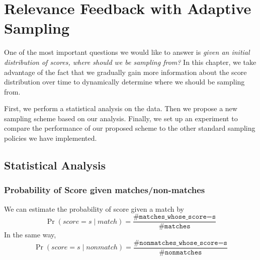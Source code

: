 \graphicspath{{./images/chap6/}}
\chapter{Relevance Feedback with Adaptive Sampling}

One of the most important questions we would like to answer is \emph{given an
initial distribution of scores, where should we be sampling from?} In this
chapter, we take advantage of the fact that we gradually gain more
information about the score distribution over time to dynamically determine
where we should be sampling from.

First, we perform a statistical analysis on the data. Then we propose a
new sampling scheme based on our analysis. Finally, we set up an experiment to
compare the performance of our proposed scheme to the other standard sampling
policies we have implemented.

\section{Statistical Analysis}

\subsection{Probability of Score given matches/non-matches}

We can estimate the probability of score given a match by
$$\Pr{(score=s \mid match)} = \frac{\texttt{\# matches\_whose\_score=s}}
    {\texttt{\# matches}}$$
In the same way,
$$\Pr{(score=s \mid nonmatch)} = \frac{\texttt{\# nonmatches\_whose\_score=s}}
    {\texttt{\# nonmatches}}$$

